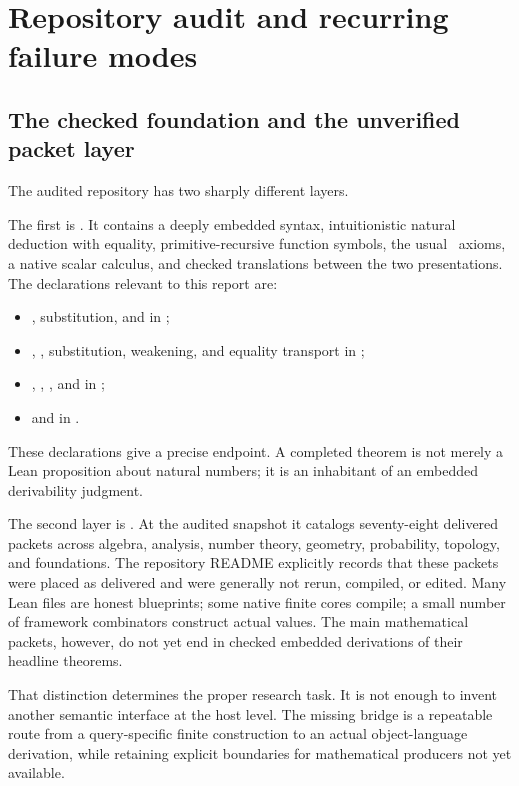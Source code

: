 \section{Repository audit and recurring failure modes}

\subsection{The checked foundation and the unverified packet layer}

The audited repository has two sharply different layers.

The first is .  It contains a deeply embedded syntax, intuitionistic natural deduction with equality, primitive-recursive function symbols, the usual \iPRA\ axioms, a native scalar calculus, and checked translations between the two presentations.  The declarations relevant to this report are:
\begin{itemize}
\item {}, substitution, and  in ;
\item {}, , substitution, weakening, and equality transport in ;
\item {}, , , and  in ;
\item {} and  in .
\end{itemize}
These declarations give a precise endpoint.  A completed theorem is not merely a Lean proposition about natural numbers; it is an inhabitant of an embedded derivability judgment.

The second layer is .  At the audited snapshot it catalogs seventy-eight delivered packets across algebra, analysis, number theory, geometry, probability, topology, and foundations.  The repository README explicitly records that these packets were placed as delivered and were generally not rerun, compiled, or edited.  Many Lean files are honest blueprints; some native finite cores compile; a small number of framework combinators construct actual  values.  The main mathematical packets, however, do not yet end in checked embedded derivations of their headline theorems.

That distinction determines the proper research task.  It is not enough to invent another semantic interface at the host level.  The missing bridge is a repeatable route from a query-specific finite construction to an actual object-language derivation, while retaining explicit boundaries for mathematical producers not yet available.

